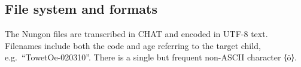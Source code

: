 \documentclass[a4paper, 11pt]{book}
\newcommand{\und}{\underline{{ }}\hspace{0.2mm}}	%
\begin{document}
\subsection{File system and formats}
The Nungon files are transcribed in CHAT and encoded in UTF-8 text. Filenames include both the code and age referring to the target child, e.g.\ “TowetOe-020310”. There is a single but frequent non-ASCII character ⟨ö⟩. 

\end{document}
